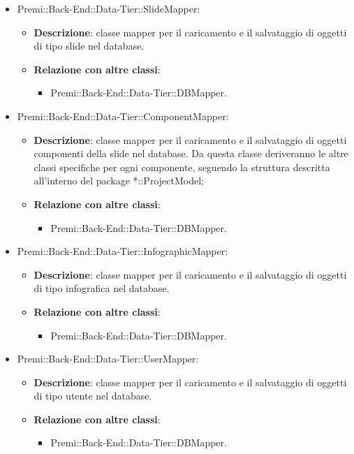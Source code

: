\begin{itemize}
			\item Premi::Back-End::Data-Tier::SlideMapper:
			\begin{itemize}
				\item \textbf{Descrizione}: classe mapper per il caricamento e il salvataggio di oggetti di tipo slide nel database.
				\item \textbf{Relazione con altre classi}:
				\begin{itemize}
					\item Premi::Back-End::Data-Tier::DBMapper.
				\end{itemize}
			\end{itemize}
			
			\item Premi::Back-End::Data-Tier::ComponentMapper:
			\begin{itemize}
				\item \textbf{Descrizione}: classe mapper per il caricamento e il salvataggio di oggetti componenti della slide nel database. Da questa classe deriveranno le altre classi specifiche per ogni componente, seguendo la struttura descritta all'interno del package *::ProjectModel;
				\item \textbf{Relazione con altre classi}:
				\begin{itemize}
					\item Premi::Back-End::Data-Tier::DBMapper.
				\end{itemize}
			\end{itemize}
			
			\item Premi::Back-End::Data-Tier::InfographicMapper:
			\begin{itemize}
				\item \textbf{Descrizione}: classe mapper per il caricamento e il salvataggio di oggetti di tipo infografica nel database.
				\item \textbf{Relazione con altre classi}:
				\begin{itemize}
					\item Premi::Back-End::Data-Tier::DBMapper.
				\end{itemize}
			\end{itemize}
			
			\item Premi::Back-End::Data-Tier::UserMapper:
			\begin{itemize}
				\item \textbf{Descrizione}: classe mapper per il caricamento e il salvataggio di oggetti di tipo utente nel database.
				\item \textbf{Relazione con altre classi}:
				\begin{itemize}
					\item Premi::Back-End::Data-Tier::DBMapper.
				\end{itemize}
			\end{itemize}
		\end{itemize}